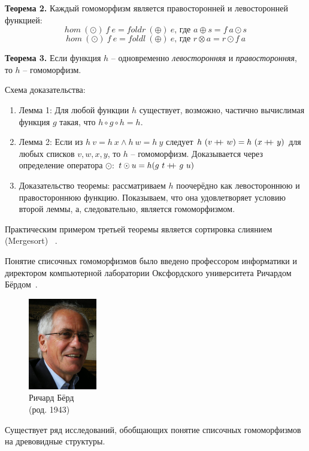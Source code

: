 \documentclass[a4paper,11pt]{article}
\newcommand\doubleplus{+\kern-1.3ex+\kern0.8ex}
\begin{document}
\textbf{Теорема 2.} Каждый гомоморфизм является правосторонней и левосторонней
функцией:
\begin{equation*}
  hom~(\odot)~f~e = foldr~(\oplus)~e \text{, где } a \oplus s = f~a \odot s
\end{equation*}
\begin{equation*}
  hom~(\odot)~f~e = foldl~(\oplus)~e \text{, где } r \otimes a = r \odot f~a
\end{equation*}

\textbf{Теорема 3.} Если функция $h$ -- одновременно \emph{левосторонняя} и
\emph{правосторонняя}, то $h$ -- гомоморфизм.

Схема доказательства:
\begin{enumerate}
\item Лемма 1: Для любой функции $h$ существует, возможно, частично вычислимая 
  функция $g$ такая, что $h \circ g \circ h = h$.
\item Лемма 2: Если из $h~v = h~x \wedge h~w = h~y$ следует 
  $h~(v \doubleplus w) = h~(x \doubleplus y)$ для любых списков $v, w, x, y$,
  то $h$ -- гомоморфизм. Доказывается через определение оператора $\odot$:
  $t \odot u = h(g~t \doubleplus g~u)$
\item Доказательство теоремы: рассматриваем $h$ поочерёдно как левостороннюю
  и правостороннюю функцию. Показываем, что она удовлетворяет условию второй
  леммы, а, следовательно, является гомоморфизмом.
\end{enumerate}

Практическим примером третьей теоремы является сортировка слиянием (Mergesort)
~\cite{Gibbons95thethird}. 

Понятие списочных гомоморфизмов было введено профессором информатики
и директором компьютерной лаборатории Оксфордского университета
Ричардом Бёрдом~\cite{Bird:1987:ITL:42675.42676}.
\begin{figure}[ht!]
  \begin{center}
    \includegraphics[height=40mm]{lecture9/bird.eps}
    \caption{Ричард Бёрд\\(род. 1943)}
  \end{center}
\end{figure}

Существует ряд исследований, обобщающих понятие списочных гомоморфизмов на
древовидные структуры.
\nocite{*}


\end{document}
